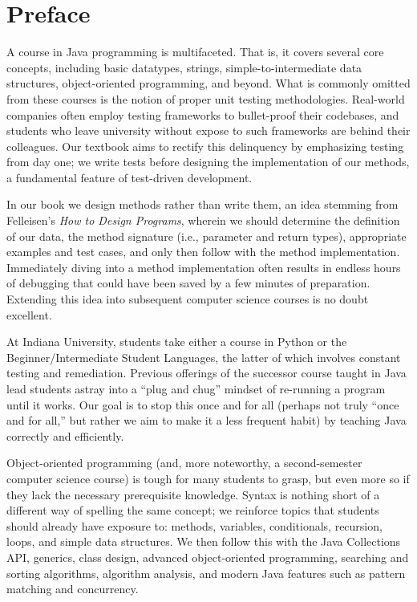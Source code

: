 \chapter*{Preface}

A course in Java programming is multifaceted. That is, it covers several core concepts, including basic datatypes, strings, simple-to-intermediate data structures, object-oriented programming, and beyond. What is commonly omitted from these courses is the notion of proper unit testing methodologies. Real-world companies often employ testing frameworks to bullet-proof their codebases, and students who leave university without expose to such frameworks are behind their colleagues. Our textbook aims to rectify this delinquency by emphasizing testing from day one; we write tests before designing the implementation of our methods, a fundamental feature of test-driven development.

In our book we design methods rather than write them, an idea stemming from Felleisen's \emph{How to Design Programs}, wherein we should determine the definition of our data, the method signature (i.e., parameter and return types), appropriate examples and test cases, and only then follow with the method implementation. Immediately diving into a method implementation often results in endless hours of debugging that could have been saved by a few minutes of preparation. Extending this idea into subsequent computer science courses is no doubt excellent.

At Indiana University, students take either a course in Python or the Beginner/Intermediate Student Languages, the latter of which involves constant testing and remediation. Previous offerings of the successor course taught in Java lead students astray into a ``plug and chug'' mindset of re-running a program until it works. Our goal is to stop this once and for all (perhaps not truly ``once and for all,'' but rather we aim to make it a less frequent habit) by teaching Java correctly and efficiently. 

Object-oriented programming (and, more noteworthy, a second-semester computer science course) is tough for many students to grasp, but even more so if they lack the necessary prerequisite knowledge. Syntax is nothing short of a different way of spelling the same concept; we reinforce topics that students should already have exposure to: methods, variables, conditionals, recursion, loops, and simple data structures. We then follow this with the Java Collections API, generics, class design, advanced object-oriented programming, searching and sorting algorithms, algorithm analysis, and modern Java features such as pattern matching and concurrency. 


